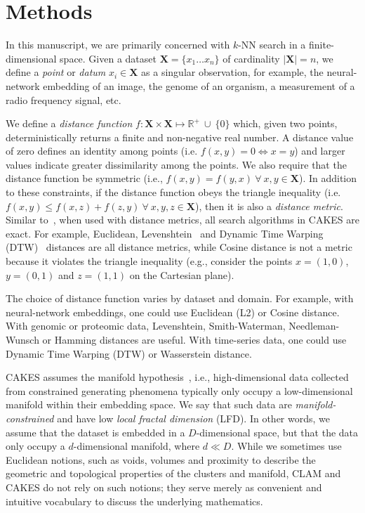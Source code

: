\section{Methods}
\label{sec:methods}

In this manuscript, we are primarily concerned with $k$-NN search in a finite-dimensional space.
Given a dataset $\textbf{X} = \{x_1 \dots x_n\}$ of cardinality $|\textbf{X}| = n$, we define a \textit{point} or \textit{datum} $x_i \in \textbf{X}$ as a singular observation, for example, the neural-network embedding of an image, the genome of an organism, a measurement of a radio frequency signal, etc.

We define a \textit{distance function} $f : \textbf{X} \times \textbf{X} \mapsto \mathbb{R}^+ \ \cup \ \{0\}$ which, given two points, deterministically returns a finite and non-negative real number.
A distance value of zero defines an identity among points (i.e. $f(x, y) = 0 \Leftrightarrow x = y$) and larger values indicate greater dissimilarity among the points.
We also require that the distance function be symmetric (i.e., $f(x, y) = f(y, x) \ \forall \ x, y \in \textbf{X}$).
In addition to these constraints, if the distance function obeys the triangle inequality (i.e. $f(x, y) \leq f(x, z) + f(z, y) \ \forall \ x, y, z \in \textbf{X}$), then it is also a \textit{distance metric}.
Similar to~\cite{yu2015entropy}, when used with distance metrics, all search algorithms in CAKES are exact.
For example, Euclidean, Levenshtein~\cite{levenshtein1966binary} and Dynamic Time Warping (DTW)~\cite{muller2007dynamic} distances are all distance metrics, while Cosine distance is not a metric because it violates the triangle inequality (e.g., consider the points $x = (1, 0)$, $y = (0, 1)$ and $z = (1, 1)$ on the Cartesian plane).

The choice of distance function varies by dataset and domain.
For example, with neural-network embeddings, one could use Euclidean (L2) or Cosine distance.
With genomic or proteomic data, Levenshtein, Smith-Waterman, Needleman-Wunsch or Hamming distances are useful.
With time-series data, one could use Dynamic Time Warping (DTW) or Wasserstein distance.

CAKES assumes the manifold hypothesis~\cite{fefferman2016testing}, i.e., high-dimensional data collected from constrained generating phenomena typically only occupy a low-dimensional manifold within their embedding space.
We say that such data are \textit{manifold-constrained} and have low \textit{local fractal dimension} (LFD).
In other words, we assume that the dataset is embedded in a $D$-dimensional space, but that the data only occupy a $d$-dimensional manifold, where $d \ll D$.
While we sometimes use Euclidean notions, such as voids, volumes and proximity to describe the geometric and topological properties of the clusters and manifold, CLAM and CAKES do not rely on such notions;
they serve merely as convenient and intuitive vocabulary to discuss the underlying mathematics.

